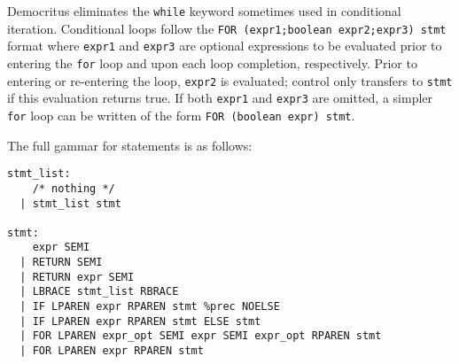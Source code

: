         \medskip \noindent
        Democritus eliminates the \texttt{while} keyword sometimes used in conditional iteration. Conditional loops follow the \verb|FOR (expr1;boolean expr2;expr3) stmt| format where \texttt{expr1} and \texttt{expr3} are optional expressions to be evaluated prior to entering the \texttt{for} loop and upon each loop completion, respectively. Prior to entering or re-entering the loop, \texttt{expr2} is evaluated; control only transfers to \texttt{stmt} if this evaluation returns true. If both \texttt{expr1} and \texttt{expr3} are omitted, a simpler \texttt{for} loop can be written of the form \verb|FOR (boolean expr) stmt|. 

    \bigskip \bigskip \bigskip \noindent
    The full gammar for statements is as follows:

    \begin{verbatim}
stmt_list:
    /* nothing */  
  | stmt_list stmt 

stmt:
    expr SEMI 
  | RETURN SEMI 
  | RETURN expr SEMI 
  | LBRACE stmt_list RBRACE 
  | IF LPAREN expr RPAREN stmt %prec NOELSE
  | IF LPAREN expr RPAREN stmt ELSE stmt   
  | FOR LPAREN expr_opt SEMI expr SEMI expr_opt RPAREN stmt
  | FOR LPAREN expr RPAREN stmt 
    \end{verbatim}
